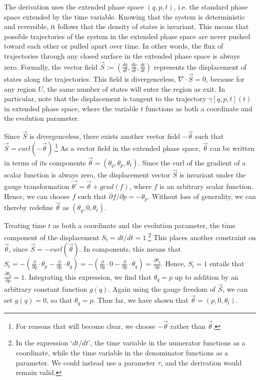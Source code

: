 \documentclass[12pt, english, twoside]{article} %
\renewcommand{\vector}[1]{\ensuremath{\vec{#1}}} %
\begin{document}
The derivation uses the extended phase space $(q, p, t)$, i.e. the standard phase space extended by the time variable. Knowing that the system is deterministic and reversible, it follows that the density of states is invariant. This means that possible trajectories of the system in the extended phase space are never pushed toward each other or pulled apart over time. In other words, the flux of trajectories through any closed surface in the extended phase space is always zero. Formally, the vector field $\vec{S} := (\frac{d q }{d t }, \frac{d p }{d t }, \frac{d t }{d t })$ represents the displacement of states along the trajectories. This field is divergenceless, $\nabla \cdot \vector{S} = 0$, because for any region $U$, the same number of states will enter the region as exit. In particular, note that the displacement is tangent to the trajectory $\gamma [q, p, t] (t)$ in extended phase space, where the variable $t$ functions as both a coordinate and the evolution parameter.

Since $\vector{S}$ is divergenceless, there exists another vector field $-\vector{\theta}$ such that $\vector{S} = curl(-\vector{\theta} )$.\footnote{For reasons that will become clear, we choose $-\vector{\theta}$ rather than $\vector{\theta}$.} As a vector field in the extended phase space, $\vector{\theta}$ can be written in terms of its components $\vector{\theta} = (\theta_q, \theta_p, \theta_t) $. Since the curl of the gradient of a scalar function is always zero, the displacement vector $\vector{S}$ is invariant under the gauge transformation $\vector{\theta'} =\vector{\theta} + grad(f)$, where $f$ is an arbitrary scalar function. Hence, we can choose $f$ such that $\partial f/ \partial p = -\theta_p $. Without loss of generality, we can thereby redefine $\vector{\theta}$ as $(\theta_q, 0, \theta_t) $.

Treating time $t$ as both a coordinate and the evolution parameter, the time component of the displacement $S_t = dt/ dt = 1$.\footnote{In the expression `$dt/dt$', the time variable in the numerator functions as a coordinate, while the time variable in the denominator functions as a parameter. We could instead use a parameter $\tau$, and the derivation would remain valid.} This places another constraint on $\vector{\theta} $, since $\vector{S} = -curl(\vector{\theta}) $. In components, this means that $S_t = - (\frac{\partial}{\partial q} \cdot \theta_p - \frac{\partial}{\partial p} \cdot \theta_q) = - (\frac{\partial}{\partial q} \cdot 0 - \frac{\partial}{\partial p} \cdot \theta_q) = \frac{\partial \theta_q}{\partial p}$. Hence, $S_t = 1$ entails that $\frac{\partial \theta_q}{\partial p} = 1$. Integrating this expression, we find that $\theta_q = p$ up to addition by an arbitrary constant function $g(q)$. Again using the gauge freedom of $\vector{S}$, we can set $g(q)=0$, so that $\theta_q = p$. Thus far, we have shown that $\vector{\theta} = (p, 0,\theta_t) $.
\end{document}
